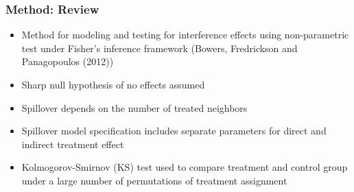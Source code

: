\documentclass{beamer}
\begin{document}
\begin{frame}
\frametitle{Method: Review}
\begin{itemize}

\item Method for modeling and testing for interference effects using non-parametric test under Fisher's inference framework (Bowers, Fredrickson and Panagopoulos (2012))
\item Sharp null hypothesis of no effects assumed
\item Spillover depends on the number of treated neighbors
\item Spillover model specification includes separate parameters for direct and indirect treatment effect
\item Kolmogorov-Smirnov (KS) test used to compare treatment and control group under a large number of permutations of treatment assignment

\end{itemize}
\end{frame}
\end{document}
